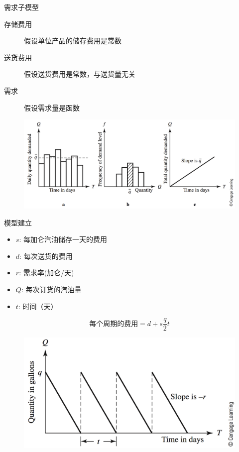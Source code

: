 \documentclass[UTF8]{ctexbeamer}
\begin{document}
\begin{frame}{需求子模型}

  \begin{description}
  \item[存储费用] 假设单位产品的储存费用是常数
  \item[送货费用] 假设送货费用是常数，与送货量无关
  \item[需求] 假设需求量是函数
  \end{description}

  \begin{figure}
    \centering
    \includegraphics[width=.8\textwidth{}]{13_2.png}
  \end{figure}
  
\end{frame}

\begin{frame}{模型建立}

  \begin{itemize}
  \item $s$: 每加仑汽油储存一天的费用
  \item $d$: 每次送货的费用
  \item $r$: 需求率(加仑/天)
  \item $Q$: 每次订货的汽油量
  \item $t$: 时间（天）
  \end{itemize}

  \[
    \text{每个周期的费用} = d + s\frac{q}{2}t
  \]

  \begin{figure}
    \centering
    \includegraphics[width=.5\textwidth{}]{13_3.png}
  \end{figure}
  
\end{frame}
\end{document}
